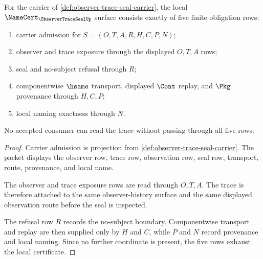 \begin{theorem}
\label{thm:observer-trace-seal-namecert-obligations}
For the carrier of \autoref{def:observer-trace-seal-carrier}, the local $\NameCert_{\ObserverTraceSealUp}$ surface consists exactly of five finite obligation rows:
\begin{enumerate}
\item carrier admission for $S=(O,T,A,R,H,C,P,N)$;
\item observer and trace exposure through the displayed $O,T,A$ rows;
\item seal and no-subject refusal through $R$;
\item componentwise $\hsame$ transport, displayed $\Cont$ replay, and $\Pkg$ provenance through $H,C,P$;
\item local naming exactness through $N$.
\end{enumerate}
No accepted consumer can read the trace without passing through all five rows.
\end{theorem}
\begin{proof}
Carrier admission is projection from \autoref{def:observer-trace-seal-carrier}. The packet displays the observer row, trace row, observation row, seal row, transport, route, provenance, and local name.

The observer and trace exposure rows are read through $O,T,A$. The trace is therefore attached to the same observer-history surface and the same displayed observation route before the seal is inspected.

The refusal row $R$ records the no-subject boundary. Componentwise transport and replay are then supplied only by $H$ and $C$, while $P$ and $N$ record provenance and local naming. Since no further coordinate is present, the five rows exhaust the local certificate.
\end{proof}

